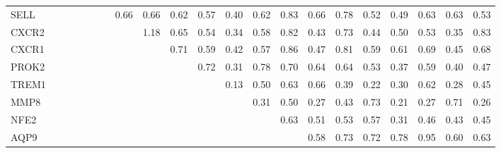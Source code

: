 \begin{longtable}{lrrrrrrrrrrrrrrrrrrrr}
SELL     &             &              &               &              &              &            &        0.66 &        0.66 &        0.62 &        0.57 &       0.40 &       0.62 &       0.83 &         0.66 &        0.78 &           0.52 &       0.49 &       0.63 &       0.63 &           0.53 \\
CXCR2    &             &              &               &              &              &            &             &        1.18 &        0.65 &        0.54 &       0.34 &       0.58 &       0.82 &         0.43 &        0.73 &           0.44 &       0.50 &       0.53 &       0.35 &           0.83 \\
CXCR1    &             &              &               &              &              &            &             &             &        0.71 &        0.59 &       0.42 &       0.57 &       0.86 &         0.47 &        0.81 &           0.59 &       0.61 &       0.69 &       0.45 &           0.68 \\
PROK2    &             &              &               &              &              &            &             &             &             &        0.72 &       0.31 &       0.78 &       0.70 &         0.64 &        0.64 &           0.53 &       0.37 &       0.59 &       0.40 &           0.47 \\
TREM1    &             &              &               &              &              &            &             &             &             &             &       0.13 &       0.50 &       0.63 &         0.66 &        0.39 &           0.22 &       0.30 &       0.62 &       0.28 &           0.45 \\
MMP8     &             &              &               &              &              &            &             &             &             &             &            &       0.31 &       0.50 &         0.27 &        0.43 &           0.73 &       0.21 &       0.27 &       0.71 &           0.26 \\
NFE2     &             &              &               &              &              &            &             &             &             &             &            &            &       0.63 &         0.51 &        0.53 &           0.57 &       0.31 &       0.46 &       0.43 &           0.45 \\
AQP9     &             &              &               &              &              &            &             &             &             &             &            &            &            &         0.58 &        0.73 &           0.72 &       0.78 &       0.95 &       0.60 &           0.63 \\

\end{longtable}

